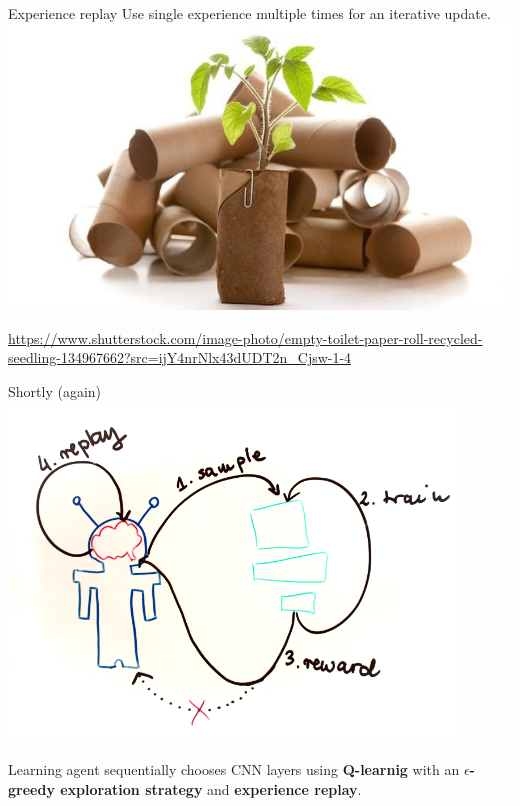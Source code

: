 \documentclass{beamer}
\begin{document}
\begin{frame}{Experience replay}
  Use single experience multiple times for an iterative update.
  \includegraphics[width=\textwidth]{reuse.jpg}\\
  \begin{tiny}
  \url{https://www.shutterstock.com/image-photo/empty-toilet-paper-roll-recycled-seedling-134967662?src=ijY4nrNlx43dUDT2n_Cjsw-1-4}
  \end{tiny}
\end{frame}


\begin{frame}{Shortly (again)}
  \includegraphics[width=0.9\textwidth]{model.png}

  Learning agent sequentially chooses CNN layers using \textbf{Q-learnig} with an \textbf{$\epsilon$-greedy exploration strategy} and \textbf{experience replay}.
\end{frame}
\end{document}

